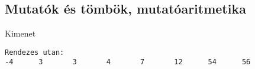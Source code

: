 \documentclass[usenames,dvipsnames,aspectratio=169]{beamer}
\begin{document}
\begin{frame}
  \begin{exampleblock}{}
    \footnotesize
    
  \end{exampleblock}
\end{frame}

\begin{frame}
  \small
  \begin{exampleblock}{}
    \vspace{-.2cm}
    \footnotesize
    
    \vspace{-.2cm}
  \end{exampleblock}
\end{frame}

\subsection{Mutatók és tömbök, mutatóaritmetika}
\begin{frame}
  \small
  \begin{exampleblock}{}
    \vspace{-.2cm}
    \small
    
    \vspace{-.2cm}
  \end{exampleblock}
\end{frame}

\begin{frame}[fragile]
  \small
  \begin{exampleblock}{}
    \vspace{-.2cm}
    \footnotesize
    
    \vspace{-.2cm}
  \end{exampleblock}
  \begin{block}{Kimenet}
    \vspace{-.4cm}
    \footnotesize
    \begin{verbatim}
Rendezes utan:
-4      3       3       4       7       12      54      56
\end{verbatim}
    \vspace{-.3cm}
  \end{block}
\end{frame}
\end{document}
